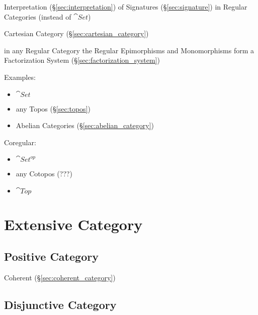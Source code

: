 Interpretation (\S\ref{sec:interpretation}) of Signatures
(\S\ref{sec:signature}) in Regular Categories (instead of $\cat{Set}$)

Cartesian Category (\S\ref{sec:cartesian_category})

in any Regular Category the Regular Epimorphisms and Monomorphisms
form a Factorization System (\S\ref{sec:factorization_system})

Examples:

\begin{itemize}
  \item $\cat{Set}$
  \item any Topos (\S\ref{sec:topos})
  \item Abelian Categories (\S\ref{sec:abelian_category})
\end{itemize}

Coregular:

\begin{itemize}
  \item $\cat{Set}^{op}$
  \item any Cotopos (???)
  \item $\cat{Top}$
\end{itemize}



\section{Extensive Category}\label{sec:extensive_category}

\subsection{Positive Category}\label{sec:positive_category}

Coherent (\S\ref{sec:coherent_category})



\subsection{Disjunctive Category}\label{sec:disjunctive_category}

